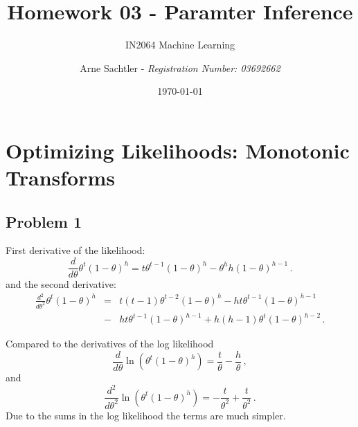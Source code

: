 \documentclass{scrartcl}
\title{Homework 03 - Paramter Inference}
\author{Arne Sachtler - \textit{Registration Number: 03692662}}
\date{\today}
\subtitle{IN2064 Machine Learning}
\begin{document}
\maketitle

\section{Optimizing Likelihoods: Monotonic Transforms} %
\label{sec:optimizing_likelihoods_monotonic_transforms}
\subsection{Problem 1} %
First derivative of the likelihood:
\begin{equation}
	\frac{d}{d\theta} \theta^t \left(1- \theta\right)^h = t \theta^{t-1}\left(1-\theta\right)^h - \theta^h h \left(1-\theta\right)^{h-1} \, .
\end{equation}
and the second derivative:
\begin{eqnarray}
	\frac{d^2}{d\theta^2} \theta^t \left(1- \theta\right)^h  &=& t(t-1)\theta^{t-2}(1-\theta)^h - ht\theta^{t-1}(1-\theta)^{h-1}\\
	&-& ht\theta^{t-1} (1-\theta)^{h-1} + h(h-1)\theta^t (1-\theta)^{h-2} \, .
\end{eqnarray}

Compared to the derivatives of the log likelihood
\begin{equation}
	\frac{d}{d\theta} \ln \left(\theta^t \left(1- \theta\right)^h\right) = \frac{t}{\theta} - \frac{h}{\theta} \, ,
\end{equation}
and 
\begin{equation}
	\frac{d^2}{d\theta^2} \ln \left(\theta^t \left(1- \theta\right)^h\right) = -\frac{t}{\theta^2} + \frac{t}{\theta^2} \, .
\end{equation}
Due to the sums in the log likelihood the terms are much simpler.

\end{document}
